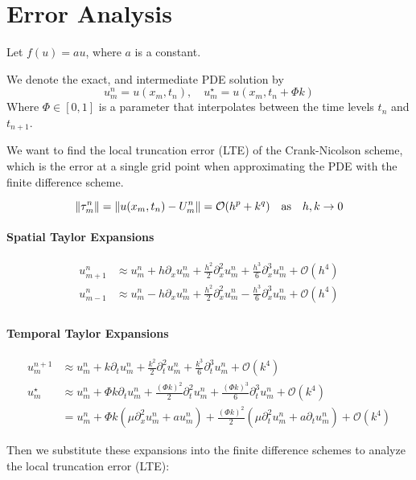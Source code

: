 \section{Error Analysis}
Let \(f(u) = a u\), where \(a\) is a constant.

We denote the exact, and intermediate PDE solution by
\[
  u_m^n = u(x_m, t_n), \quad u_m^\star = u(x_m, t_n + \Phi k)
\]
Where \(\Phi \in [0, 1]\) is a parameter that interpolates between the time levels \(t_n\) and \(t_{n+1}\).

We want to find the local truncation error (LTE) of the Crank-Nicolson scheme, which is the error at a single grid point when approximating the PDE with the finite difference scheme.

\[
  \lVert\tau_m^n\rVert = \lVert u(x_m, t_n) - U_m^n\rVert = \mathcal{O}(h^p + k^q) \quad \text{as} \quad h, k \to 0
\]


\paragraph{Spatial Taylor Expansions}
\begin{align*}
  u_{m+1}^n & \approx u_m^n + h \partial_x u_m^n + \frac{h^2}{2} \partial_x^2 u_m^n + \frac{h^3}{6} \partial_x^3 u_m^n + \mathcal{O}(h^4) \\
  u_{m-1}^n & \approx u_m^n - h \partial_x u_m^n + \frac{h^2}{2} \partial_x^2 u_m^n - \frac{h^3}{6} \partial_x^3 u_m^n + \mathcal{O}(h^4) \\
\end{align*}

\paragraph{Temporal Taylor Expansions}
\begin{align*}
  u_m^{n+1} & \approx u_m^n + k \partial_t u_m^n + \frac{k^2}{2} \partial_t^2 u_m^n + \frac{k^3}{6} \partial_t^3 u_m^n + \mathcal{O}(k^4)                    \\
  u_m^\star & \approx u_m^n + \Phi k \partial_t u_m^n + \frac{(\Phi k)^2}{2} \partial_t^2 u_m^n + \frac{(\Phi k)^3}{6} \partial_t^3 u_m^n + \mathcal{O}(k^4) \\
  &= u_m^n + \Phi k \left( \mu \partial_x^2 u_m^n + a u_m^n \right) + \frac{(\Phi k)^2}{2} \left( \mu \partial_t^2 u_m^n + a \partial_t u_m^n \right) + \mathcal{O}(k^4)
\end{align*}

Then we substitute these expansions into the finite difference schemes to analyze the local truncation error (LTE):

